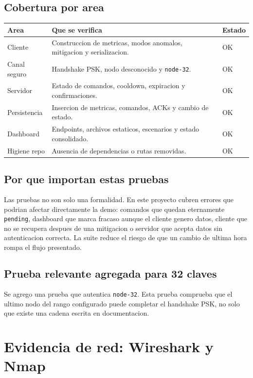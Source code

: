 \documentclass[11pt,letterpaper]{article}
\begin{document}
\subsection{Cobertura por area}

\begin{longtable}{|p{}|p{}|p{}|}
\hline
\textbf{Area} & \textbf{Que se verifica} & \textbf{Estado} \\
\hline
Cliente & Construccion de metricas, modos anomalos, mitigacion y serializacion. & OK \\
\hline
Canal seguro & Handshake PSK, nodo desconocido y \texttt{node-32}. & OK \\
\hline
Servidor & Estado de comandos, cooldown, expiracion y confirmaciones. & OK \\
\hline
Persistencia & Insercion de metricas, comandos, ACKs y cambio de estado. & OK \\
\hline
Dashboard & Endpoints, archivos estaticos, escenarios y estado consolidado. & OK \\
\hline
Higiene repo & Ausencia de dependencias o rutas removidas. & OK \\
\hline
\end{longtable}

\subsection{Por que importan estas pruebas}

Las pruebas no son solo una formalidad. En este proyecto cubren errores que
podrian afectar directamente la demo: comandos que quedan eternamente
\texttt{pending}, dashboard que marca fracaso aunque el cliente genero datos,
cliente que no se recupera despues de una mitigacion o servidor que acepta datos
sin autenticacion correcta. La suite reduce el riesgo de que un cambio de ultima
hora rompa el flujo presentado.

\subsection{Prueba relevante agregada para 32 claves}

Se agrego una prueba que autentica \texttt{node-32}. Esta prueba comprueba que el
ultimo nodo del rango configurado puede completar el handshake PSK, no solo que
existe una cadena escrita en documentacion.

\newpage
\section{Evidencia de red: Wireshark y Nmap}
\end{document}
